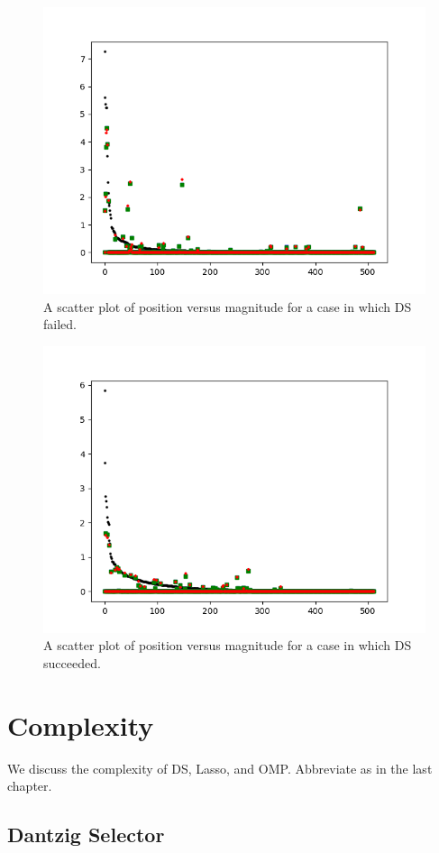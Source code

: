 \bigskip
\begin {figure} [H]
\includegraphics [width = 0.8 \textwidth] {scatter-ddss-failure.png}
\caption {A scatter plot of position versus magnitude for a case in which DS failed.}
\end {figure}
%
\begin {figure} [H]
\includegraphics [width = 0.8 \textwidth] {scatter-ddss-success.png}
\caption {A scatter plot of position versus magnitude for a case in which DS succeeded.}
\end {figure}
\bigskip

\section {Complexity}

We discuss the complexity of DS, Lasso, and OMP.
Abbreviate  as in the last chapter.

\subsection {Dantzig Selector}

